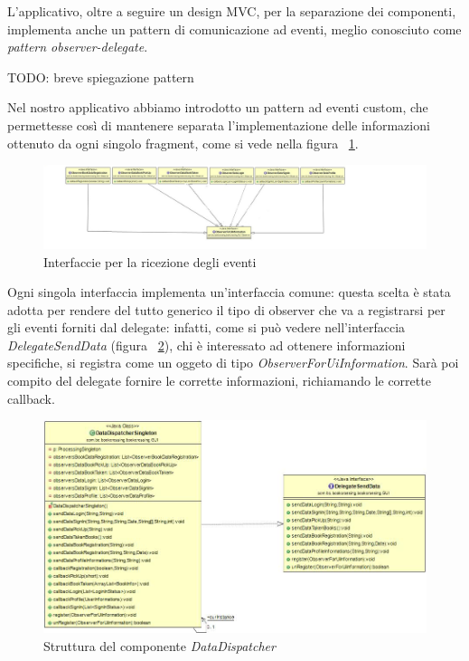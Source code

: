 L'applicativo, oltre a seguire un design MVC, per la separazione dei componenti, implementa anche un pattern di comunicazione ad eventi, meglio conosciuto come \textit{pattern observer-delegate}. 

TODO: breve spiegazione pattern 

Nel nostro applicativo abbiamo introdotto un pattern ad eventi custom, che permettesse così di mantenere separata l'implementazione delle informazioni ottenuto da ogni singolo fragment, come si vede nella figura ~\ref{fig:ObserverForUiInformation}.
\begin{figure}[h]
	\includegraphics[width=\textwidth]{Immagini/ObserverForUIInformation}
	\caption{Interfaccie per la ricezione degli eventi}
	\label{fig:ObserverForUiInformation}
\end{figure}
Ogni singola interfaccia implementa un'interfaccia comune: questa scelta è stata adotta per rendere del tutto generico il tipo di observer che va a registrarsi per gli eventi forniti dal delegate: infatti, come si può vedere nell'interfaccia \textit{DelegateSendData} (figura ~\ref{fig:DataDispatcher}), chi è interessato ad ottenere informazioni specifiche, si registra come un oggeto di tipo \textit{ObserverForUiInformation}. Sarà poi compito del delegate fornire le corrette informazioni, richiamando le corrette callback.

\begin{figure}[h]
	\includegraphics[width=\textwidth]{Immagini/ClassDiagramDispatcherDelegate}
	\caption{Struttura del componente \textit{DataDispatcher}}
	\label{fig:DataDispatcher}
\end{figure}


